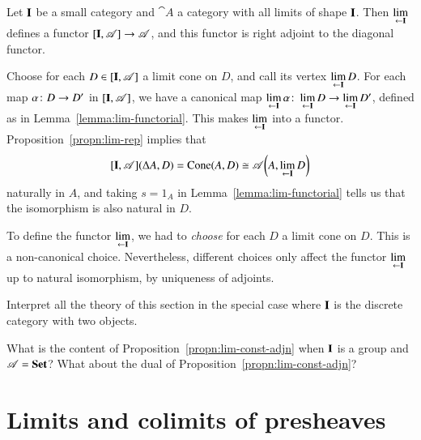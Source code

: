\begin{propn}   
\label{propn:lim-const-adjn}
%
%
Let $\mathbf{I}$ be a small category and $\cat{A}$ a category with all limits of
shape $\mathbf{I}$.  Then $\lim\limits_{\leftarrow \mathbf{I}}$ defines a functor
$[\mathbf{I},\mathscr{A}] \to \mathscr{A}$, and this functor is right adjoint
to the diagonal functor.  
\end{propn}

\begin{pf}
Choose for each $D \in [\mathbf{I},\mathscr{A}]$ a limit cone on $D$, and
call its vertex $\lim\limits_{\leftarrow \mathbf{I}} D$.  For each map $\alpha\from D \to D'$ in
$[\mathbf{I},\mathscr{A}]$, we have a canonical map
$\lt{\scat{I}} \alpha \from \lt{\scat{I}} D \to \lt{\scat{I}} D'$,
defined as in
Lemma~\ref{lemma:lim-functorial}.  This
makes $\lim\limits_{\leftarrow \mathbf{I}}$ into a functor.  Proposition~\ref{propn:lim-rep}
implies that
\[
[\mathbf{I},\mathscr{A}](\Delta A, D)
=
\operatorname{Cone}(A, D)
\cong
\mathscr{A}\biggl(A, \lim\limits_{\leftarrow \mathbf{I}} D\biggr)
\]
naturally in $A$, and taking $s = 1_A$ in
Lemma~\ref{lemma:lim-functorial} tells
us that the isomorphism is also natural in $D$.
\end{pf}

To define the functor $\lim\limits_{\leftarrow \mathbf{I}}$, we had to \emph{choose}%
%
%
for each $D$ a limit cone on $D$.  This is a non-canonical choice.
Nevertheless, different choices only affect the functor $\lim\limits_{\leftarrow \mathbf{I}}$ up
to natural isomorphism, by uniqueness of adjoints.


\exs


\begin{question}
Interpret all the theory of this section in the special case where
$\mathbf{I}$ is the discrete category with two objects.
\end{question}


\begin{question}
What is the content of Proposition~\ref{propn:lim-const-adjn} when
$\mathbf{I}$ is a group and $\mathscr{A} = \mathbf{Set}$?  What about the dual of
Proposition~\ref{propn:lim-const-adjn}? 
\end{question}



\section{Limits and colimits of presheaves}
\label{sec:lim-pshf}


